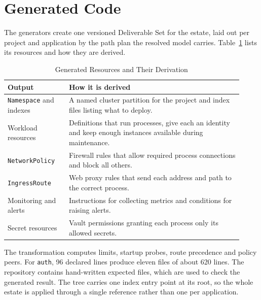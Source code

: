 \section{Generated Code}
\label{sec:generatedcode}

The generators create one versioned Deliverable Set for the estate, laid out
per project and application by the path plan the resolved model carries.
Table~\ref{tab:generated_resources} lists its resources and how they are
derived.

\begin{table}[!htbp]
\centering
\small
\begin{tabular}{>{\raggedright\arraybackslash}p{0.24\linewidth}>{\raggedright\arraybackslash}p{0.68\linewidth}}
\hline
\textbf{Output} & \textbf{How it is derived} \\
\hline
\texttt{Namespace} and indexes &
  A named cluster partition for the project and index files listing what to deploy. \\
Workload resources &
  Definitions that run processes, give each an identity and keep enough instances available during maintenance. \\
\texttt{NetworkPolicy} &
  Firewall rules that allow required process connections and block all others. \\
\texttt{IngressRoute} &
  Web proxy rules that send each address and path to the correct process. \\
Monitoring and alerts &
  Instructions for collecting metrics and conditions for raising alerts. \\
Secret resources &
  Vault permissions granting each process only its allowed secrets. \\
\hline
\end{tabular}
\caption{Generated Resources and Their Derivation}
\label{tab:generated_resources}
\end{table}

The transformation computes limits, startup probes, route precedence and policy
peers. For \texttt{auth}, 96 declared lines produce eleven files of about 620
lines. The repository contains hand-written expected files, which are used to
check the generated result. The tree carries one index entry point at its root,
so the whole estate is applied through a single reference rather than one per
application.
